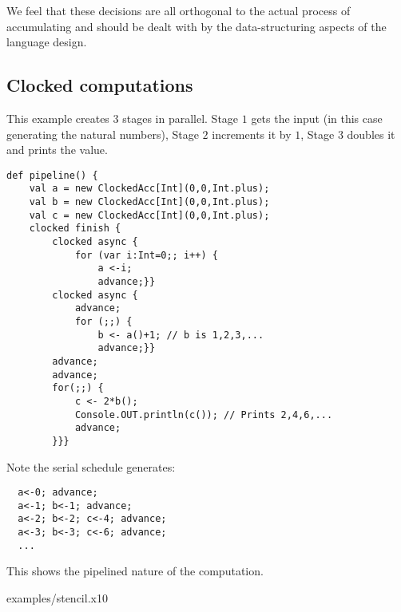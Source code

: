We feel that these decisions are all orthogonal to the actual process
of accumulating and should be dealt with by the data-structuring
aspects of the language design.

\subsection{Clocked computations}

\begin{example}[Pipeline]
This example creates $3$ stages in parallel. Stage $1$ gets the input
(in this case generating the natural numbers), Stage $2$ increments it
by $1$, Stage $3$ doubles it and prints the value.
\begin{lstlisting}
def pipeline() {
    val a = new ClockedAcc[Int](0,0,Int.plus);
    val b = new ClockedAcc[Int](0,0,Int.plus);
    val c = new ClockedAcc[Int](0,0,Int.plus);
    clocked finish {
        clocked async {
            for (var i:Int=0;; i++) {
                a <-i;
                advance;}}
        clocked async {
            advance;
            for (;;) {
                b <- a()+1; // b is 1,2,3,...
                advance;}}
        advance;
        advance;
        for(;;) {
            c <- 2*b();
            Console.OUT.println(c()); // Prints 2,4,6,...
            advance;
        }}}
  \end{lstlisting}
Note the serial schedule generates:
\begin{lstlisting}
  a<-0; advance;
  a<-1; b<-1; advance;
  a<-2; b<-2; c<-4; advance;
  a<-3; b<-3; c<-6; advance;
  ...
\end{lstlisting}
\noindent This shows the pipelined nature of the computation.
\end{example}

 {examples/stencil.x10}
